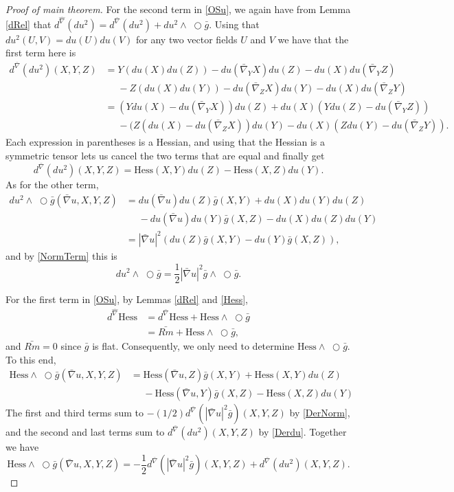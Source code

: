 \documentclass{amsart}
\newcommand{\wtimes}{\wedge \!\!\!\!\!\!\!\!\;\bigcirc}
\begin{document}
\begin{proof}[Proof of main theorem]
For the second term in \eqref{OSu}, we again have from Lemma \ref{dRel} that $d^{\hat{\nabla}}(du^2) = d^{\bar{\nabla}}(du^2) + du^2\wtimes \bar{g}$.
Using that $du^2(U,V) = du(U)du(V)$ for any two vector fields $U$ and $V$ we have that the first term here is 
\begin{align*}
d^{\bar{\nabla}}(du^2)(X,Y,Z)
&= Y(du(X)du(Z)) - du(\bar{\nabla}_YX)du(Z) - du(X)du(\bar{\nabla}_YZ) \\
&\phantom{=} - Z(du(X)du(Y)) - du(\bar{\nabla}_ZX)du(Y) - du(X)du(\bar{\nabla}_ZY) \\[2mm]
&= (Ydu(X) - du(\bar{\nabla}_YX))du(Z) + du(X)(Ydu(Z)-du(\bar{\nabla}_YZ)) \\
&\phantom{=} - (Z(du(X) - du(\bar{\nabla}_ZX))du(Y) - du(X)(Zdu(Y)-du(\bar{\nabla}_ZY)).
\end{align*}
Each expression in parentheses is a Hessian, and using that the Hessian is a symmetric tensor lets us cancel the two terms that are equal and finally get 
\begin{equation}
\label{Derdu}
d^{\bar{\nabla}}(du^2)(X,Y,Z) = \mathrm{Hess}(X,Y)du(Z) - \mathrm{Hess}(X,Z)du(Y).
\end{equation}
As for the other term, 
\begin{align*}
du^2\wtimes \bar{g}(\bar{\nabla}u,X,Y,Z)
&= du(\bar{\nabla}u)du(Z)\bar{g}(X,Y) + du(X)du(Y)du(Z) \\
&\phantom{=} - du(\bar{\nabla}u)du(Y)\bar{g}(X,Z) - du(X)du(Z)du(Y) \\[2mm]
&= |\bar{\nabla}u|^2(du(Z)\bar{g}(X,Y) - du(Y)\bar{g}(X,Z)),
\end{align*}
and by \eqref{NormTerm} this is 
\begin{equation}
du^2\wtimes\bar{g} = \frac{1}{2}|\bar{\nabla}u|^2\bar{g}\wtimes\bar{g}.
\end{equation}

For the first term in \eqref{OSu}, by Lemmas \ref{dRel} and \ref{Hess}, 
\begin{align*}
d^{\hat{\nabla}}\mathrm{Hess} 
&= d^{\bar{\nabla}}\mathrm{Hess} + \mathrm{Hess}\wtimes \bar{g} \\
&= \bar{Rm} + \mathrm{Hess}\wtimes \bar{g},
\end{align*}
and $\bar{Rm} = 0$ since $\bar{g}$ is flat. 
Consequently, we only need to determine $\mathrm{Hess}\wtimes \bar{g}$. 
To this end, 
\begin{align*}
\mathrm{Hess}\wtimes \bar{g}(\bar{\nabla}u,X,Y,Z)
&= \mathrm{Hess}(\bar{\nabla}u,Z)\bar{g}(X,Y) + \mathrm{Hess}(X,Y)du(Z) \\
&\phantom{=} -\mathrm{Hess}(\bar{\nabla}u,Y)\bar{g}(X,Z) - \mathrm{Hess}(X,Z)du(Y)
\end{align*}
The first and third terms sum to $-(1/2)d^{\bar{\nabla}}(|\bar{\nabla}u|^2\bar{g})(X,Y,Z)$ by \eqref{DerNorm}, and the second and last terms sum to $d^{\bar{\nabla}}(du^2)(X,Y,Z)$ by \eqref{Derdu}.
Together we have 
\begin{equation}
\label{HessProd}
\mathrm{Hess}\wtimes \bar{g}(\bar{\nabla}u,X,Y,Z) = -\frac{1}{2}d^{\bar{\nabla}}(|\bar{\nabla}u|^2\bar{g})(X,Y,Z) + d^{\bar{\nabla}}(du^2)(X,Y,Z).
\end{equation}


\end{proof}
\end{document}
